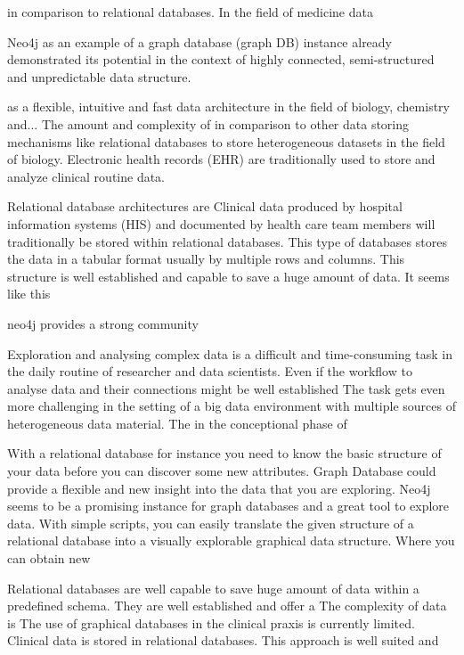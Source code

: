  in comparison to relational databases. In the field of medicine data 





Neo4j as an example of a graph database (graph DB) instance already demonstrated its potential in the context of highly connected, semi-structured and unpredictable data structure. 

as a flexible, intuitive and fast data architecture in the field of biology, chemistry and... The amount and complexity of in comparison to other data storing mechanisms like relational databases to store heterogeneous datasets in the field of biology. Electronic health records (EHR) are traditionally used to store and analyze clinical routine data. 

Relational database architectures are 
Clinical data produced by hospital information systems (HIS) and documented by health care team members will traditionally be stored within relational databases. This type of databases stores the data in a tabular format usually by multiple rows and columns. This structure is well established and capable to save a huge amount of data. It seems like this

neo4j provides a strong community 

Exploration and analysing complex data is a difficult and time-consuming task in the daily routine of researcher and data scientists. Even if the workflow to analyse data and their connections might be well established The task gets even more challenging in the setting of a big data environment with multiple sources of heterogeneous data material. The in the conceptional phase of

With a relational database for instance you need to know the basic structure of your data before you can discover some new attributes. Graph Database could provide a flexible and new insight into the data that you are exploring. Neo4j seems to be a promising instance for graph databases and a great tool to explore data. With simple scripts, you can easily translate the given structure of a relational database into a visually explorable graphical data structure. Where you can obtain new 

Relational databases are well capable to save huge amount of data within a predefined schema. They are well established and offer a 
The complexity of data is 
The use of graphical databases in the clinical praxis is currently limited. Clinical data is stored in relational databases. This approach is well suited and 

